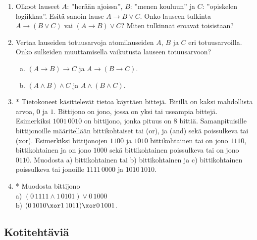 \begin{enumerate}
\item Olkoot lauseet $A$: ''herään ajoissa'', $B$: ''menen kouluun'' ja $C$: ''opiskelen logiikkaa''.
Esitä sanoin lause $A \to B \lor C$. Onko lauseen tulkinta $A \to (B \lor C)$ vai $(A \to B) \lor C$? Miten tulkinnat eroavat toisistaan? 

\newpage

\item
Vertaa lauseiden totuusarvoja atomilauseiden $A$, $B$ ja $C$ eri totuusarvoilla. Onko sulkeiden muuttamisella vaikutusta lauseen totuusarvoon?
\begin{enumerate}[a)]
\item $(A\to B)\to C$ ja $A\to (B\to C)$.
\item $(A\land B)\land C$ ja $A\land (B\land C)$.
\end{enumerate}

\item * Tietokoneet käsittelevät tietoa käyttäen bittejä. Bitillä on kaksi mahdollista arvoa, $0$ ja $1$.
Bittijono on jono, jossa on yksi tai useampia bittejä. Esimerkiksi $1001\, 0010$ on bittijono, jonka pituus on $8$ bittiä. Samanpituisille bittijonoille määritellään bittikohtaiset tai (or), ja (and) sekä poissulkeva tai (xor). Esimerkiksi bittijonojen $1100$ ja $1010$ bittikohtainen tai on jono $1110$, bittikohtainen ja on jono $1000$ sekä bittikohtainen poissulkeva tai on jono $0110$. Muodosta a) bittikohtainen tai  b) bittikohtainen ja c) bittikohtainen poissulkeva tai jonoille $1111\, 0000$ ja $1010\, 1010$.

\item * Muodosta bittijono\\
a)  $(0\, 1111 \land 1\, 0101) \lor 0\, 1000$\\
b) $(0\, 1010 \xor 1\, 1011) \xor 0\, 1001$. 

\end{enumerate}

\subsection*{Kotitehtäviä}

